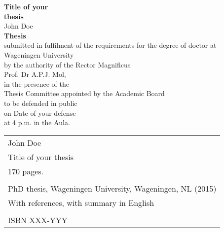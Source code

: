 \newpage
\thispagestyle{empty}
\begin{center}
\Huge{\textbf{Title of your}} \\
\Huge{\textbf{thesis}} \\
\vspace*{1cm}
\Large{John Doe}\\
\normalsize
\vspace*{\fill}
\textbf{Thesis} \\
submitted in fulfilment of the requirements for the degree of doctor at \\
Wageningen University\\
by the authority of the Rector Magnificus\\
Prof. Dr A.P.J. Mol,\\
in the presence of the\\
Thesis Committee appointed by the Academic Board\\
to be defended in public\\
on Date of your defense\\
at 4 p.m. in the Aula.\\
\end{center}

\newpage
\thispagestyle{empty}
\vspace*{\fill}
\begin{tabular}{@{}p{\textwidth}}
    John Doe                                                 \\  
    Title of your thesis                                     \\  
    170 pages.                                               \\  
                                                             \\  
    PhD thesis, Wageningen University, Wageningen, NL (2015) \\  
    With references, with summary in English                 \\  
                                                             \\  
    ISBN XXX-YYY                                             \\  
\end{tabular}
